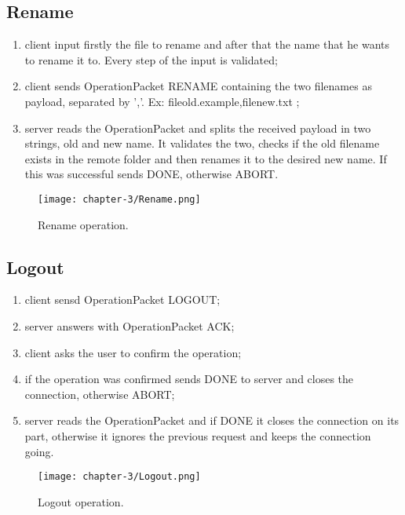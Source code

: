 \subsection{Rename}
\begin{enumerate}
	\item client input firstly the file to rename and after that the name that he wants to rename it to. Every step of the input is validated;
	\item client sends OperationPacket RENAME containing the two filenames as payload, separated by ','. Ex: fileold.example,filenew.txt ;
	\item server reads the OperationPacket and splits the received payload in two strings, old and new name. It validates the two, checks if the old filename exists in the remote folder and then renames it to the desired new name. If this was successful sends DONE, otherwise ABORT.
\end{enumerate}

\begin{figure}[!h] 
    \centering 
    \texttt{[image: chapter-3/Rename.png]} 
    \caption{Rename operation.}
    \label{fig:rename_operation}
\end{figure}
\newpage{}
\subsection{Logout}
\begin{enumerate}
	\item client sensd OperationPacket LOGOUT;
	\item server answers with OperationPacket ACK;
	\item client asks the user to confirm the operation;
	\item if the operation was confirmed sends DONE to server and closes the connection, otherwise ABORT;
	\item server reads the OperationPacket and if DONE it closes the connection on its part, otherwise it ignores the previous request and keeps the connection going.
\end{enumerate}


\begin{figure}[!h] 
    \centering 
    \texttt{[image: chapter-3/Logout.png]} 
    \caption{Logout operation.}
    \label{fig:logout_operation}
\end{figure}
